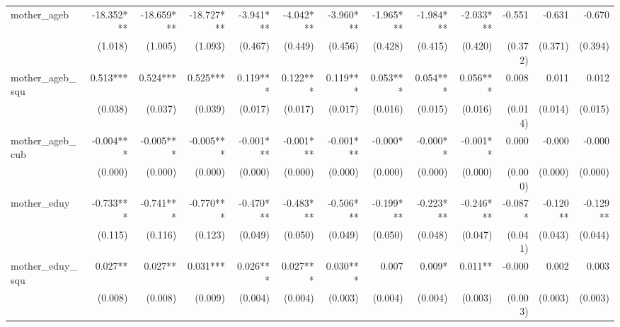 \begin{tabular}{lrrrrrrrrrrrr}
mother\_ageb                                &   -18.352*** &   -18.659*** &   -18.727*** &    -3.941*** &    -4.042*** &    -3.960*** &    -1.965*** &    -1.984*** &    -2.033*** &       -0.551 &       -0.631 &       -0.670 \\ 
                                            &      (1.018) &      (1.005) &      (1.093) &      (0.467) &      (0.449) &      (0.456) &      (0.428) &      (0.415) &      (0.420) &      (0.372) &      (0.371) &      (0.394) \\ 
mother\_ageb\_squ                           &     0.513*** &     0.524*** &     0.525*** &     0.119*** &     0.122*** &     0.119*** &     0.053*** &     0.054*** &     0.056*** &        0.008 &        0.011 &        0.012 \\ 
                                            &      (0.038) &      (0.037) &      (0.039) &      (0.017) &      (0.017) &      (0.017) &      (0.016) &      (0.015) &      (0.016) &      (0.014) &      (0.014) &      (0.015) \\ 
mother\_ageb\_cub                           &    -0.004*** &    -0.005*** &    -0.005*** &    -0.001*** &    -0.001*** &    -0.001*** &      -0.000* &     -0.000** &     -0.001** &        0.000 &       -0.000 &       -0.000 \\ 
                                            &      (0.000) &      (0.000) &      (0.000) &      (0.000) &      (0.000) &      (0.000) &      (0.000) &      (0.000) &      (0.000) &      (0.000) &      (0.000) &      (0.000) \\ 
mother\_eduy                                &    -0.733*** &    -0.741*** &    -0.770*** &    -0.470*** &    -0.483*** &    -0.506*** &    -0.199*** &    -0.223*** &    -0.246*** &      -0.087* &     -0.120** &     -0.129** \\ 
                                            &      (0.115) &      (0.116) &      (0.123) &      (0.049) &      (0.050) &      (0.049) &      (0.050) &      (0.048) &      (0.047) &      (0.041) &      (0.043) &      (0.044) \\ 
mother\_eduy\_squ                           &      0.027** &      0.027** &     0.031*** &     0.026*** &     0.027*** &     0.030*** &        0.007 &       0.009* &      0.011** &       -0.000 &        0.002 &        0.003 \\ 
                                            &      (0.008) &      (0.008) &      (0.009) &      (0.004) &      (0.004) &      (0.003) &      (0.004) &      (0.004) &      (0.003) &      (0.003) &      (0.003) &      (0.003) \\ 

\end{tabular}
